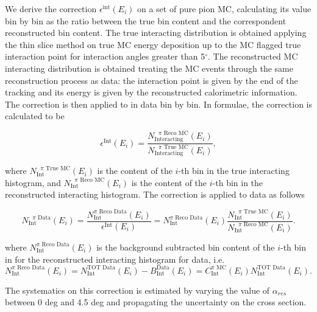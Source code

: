 We derive the correction $\epsilon^{\text{int}}(E_i)$ on a set of pure pion MC, calculating its value bin by bin as the ratio between the true bin content and the correspondent reconstructed bin content. The true interacting distribution is obtained applying the thin slice method on true MC energy deposition up to the MC flagged true interaction point for interaction angles greater than 5$^\circ$. The reconstructed MC interacting distribution is obtained treating the MC events through the same reconstruction process as data: the interaction point is given by the end of the tracking and its energy is given by the reconstructed calorimetric information. The correction is then applied to in data bin by bin. In formulae, the correction is calculated to be

\begin{equation}
 \epsilon^{\text{Int}}(E_i)  =  \frac{N^{\text{ $\pi$ Reco MC}}_{\text{Interacting}} (E_{i})}{ N^{\text{ $\pi$ True MC}}_{\text{Interacting}} (E_{i})  },
\end{equation}
 
where $N^{\text{ $\pi$ True MC}}_{\text{Int}} (E_{i}) $ is the content of the $i$-th bin in the true interacting histogram, and $N^{\text{ $\pi$ Reco MC}}_{\text{Int}} (E_{i}) $ is the content of the $i$-th bin in the reconstructed interacting histogram. The correction is applied to data as follows

\begin{equation}
N^{\text{ $\pi$  Data}}_{\text{Int}} (E_{i})  =  \frac{N^{\text{$\pi$ Reco Data}}_{\text{Int}} (E_{i})}{\epsilon^{\text{Int}} (E_{i}) } = N^{\text{$\pi$ Reco Data}}_{\text{Int}} (E_{i}) \frac{N^{\text{ $\pi$ True MC}}_{\text{Int}} (E_{i})}{ N^{\text{ $\pi$ Reco MC}}_{\text{Int}} (E_{i})}.
\end{equation}

where $N^{\text{$\pi$ Reco Data}}_{\text{Int}} (E_{i})$ is the background subtracted bin content of the $i$-th bin in for the reconstructed interacting histogram for data, i.e. 
\begin{equation}
N^{\text{$\pi$ Reco Data}}_{\text{Int}} (E_{i}) =  N^{\text{TOT Data}}_{\text{Int}} (E_{i}) - B^{\text{Data}}_{\text{Int}} (E_i)  =  C^{\text{$\pi$ MC}}_{\text{Int}} (E_{i}) N^{\text{TOT Data}}_{\text{Int}} (E_{i}).
\end{equation}


 The systematics on this correction is estimated by varying the value of $\alpha_{res}$ between 0 deg and 4.5 deg and propagating the uncertainty on the cross section. 


